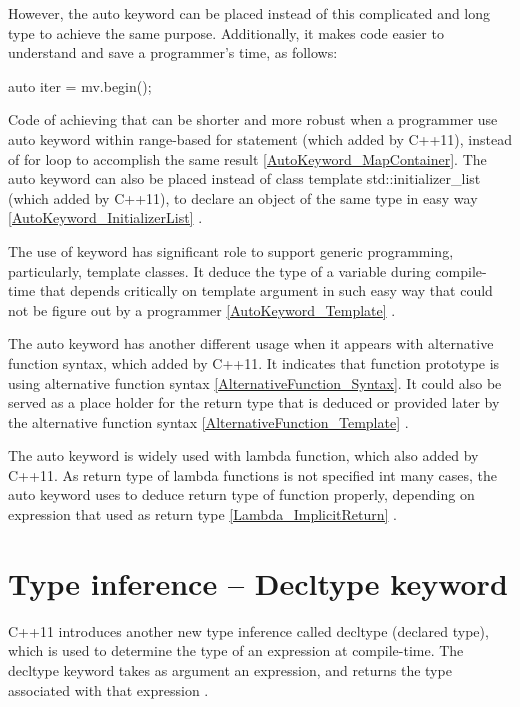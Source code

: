 \documentclass[11pt]{report}
\begin{document}
However, the auto keyword can be placed instead of this complicated and long type to achieve the same purpose. Additionally, it makes code easier to understand and save a programmer's time, as follows:

\begin{center}
auto iter = mv.begin();
\end{center}

Code of achieving that can be shorter and more robust when a programmer use auto keyword within range-based for statement (which added by C++11), instead of for loop to accomplish the same result \ref{AutoKeyword_MapContainer}. The auto keyword can also be placed instead of class template std::initializer\_list (which added by C++11), to declare an object of the same type in easy way \ref{AutoKeyword_InitializerList} \cite{Gregorie:professionalcpp}.


The use of keyword has significant role to support generic programming, particularly, template classes. It deduce the type of a variable  during compile- time that depends critically on template argument in such easy way that could not be figure out by a programmer \ref{AutoKeyword_Template} \cite{Stroustrup:2012:Cpp11}.


The auto keyword has another different usage when it appears with alternative function syntax, which added by C++11. It indicates that function prototype is using alternative function syntax \ref{AlternativeFunction_Syntax}. It could also be served as a place holder for the return type that is deduced or provided later by the alternative function syntax \ref{AlternativeFunction_Template} \cite{Prata:2012:Cpp}.


The auto keyword is widely used with lambda function, which also added by C++11. As return type of lambda functions is not specified int many cases, the auto keyword uses to deduce return type of function properly, depending on expression that used as return type \ref{Lambda_ImplicitReturn} \cite{Gregorie:professionalcpp}.

\section{Type inference – Decltype keyword}
\label{section: Decltype keyword}
C++11 introduces another new type inference called decltype (declared type), which is used to determine the type of an expression at compile-time. The decltype keyword takes as argument an expression, and returns the type associated with that expression \cite{Stroustrup:2012:Cpp11}. 
\end{document}
